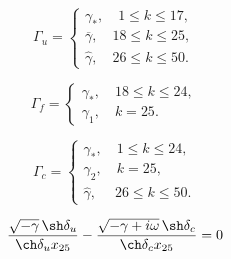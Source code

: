 \documentclass[fullscreen=true, unicode, bookmarks=false]{beamer}
\begin{document}
\begin{frame}

\begin{equation}
    \Gamma_u =\left\{
                \begin{array}{ll}
                  \gamma_*, \quad 1 \leqslant k \leqslant 17,\\
                  \overline{\gamma}, \quad 18 \leqslant k \leqslant 25,\\
                  \hat{\gamma}, \quad 26 \leqslant k \leqslant 50.
                \end{array}
              \right.
\end{equation}

\begin{equation}
    \Gamma_f =\left\{
                \begin{array}{ll}
                  \gamma_*, \quad 18 \leqslant k \leqslant 24,\\
                  \gamma_1, \quad k = 25.
                \end{array}
              \right.
\end{equation}

\begin{equation}
    \Gamma_c =\left\{
                \begin{array}{ll}
                  \gamma_*, \quad 1 \leqslant k \leqslant 24,\\
                  \gamma_2, \quad k = 25,\\
                  \hat{\gamma}, \; \quad 26 \leqslant k \leqslant 50.
                \end{array}
              \right.
\end{equation}

\bigskip

\begin{equation}
\frac{\sqrt{-\gamma} \, \sh \delta_u}{\ch \delta_u x_{25}} - \frac{\sqrt{-\gamma + i \omega} \, \sh \delta_c}{\ch \delta_c x_{25}} = 0
\end{equation}

\end{frame}
\end{document}
